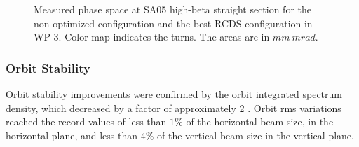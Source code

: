 \begin{figure}[htb]
\begin{minipage}{0.48\textwidth}
        \caption{Measured phase space at SA05 high-beta straight section for the non-optimized configuration and the best RCDS configuration in WP 3. Color-map indicates the turns. The areas are in $\unit{mm}~\unit{mrad}$.}
    \end{minipage}
\end{figure}
\subsubsection{Orbit Stability}
Orbit stability improvements were confirmed by the orbit integrated spectrum density, which decreased by a factor of approximately 2 \cite{Liu:IPAC23-WEOGA2}. Orbit rms variations reached the record values of less than $1\%$ of the horizontal beam size, in the horizontal plane, and less than $4\%$ of the vertical beam size in the vertical plane.


